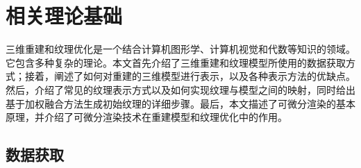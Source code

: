 \setcounter{figure}{0}
\setcounter{table}{0}
\setcounter{algocf}{0}


\chapter{相关理论基础}
三维重建和纹理优化是一个结合计算机图形学、计算机视觉和代数等知识的领域。它包含多种复杂的理论。本文首先介绍了三维重建和纹理模型所使用的数据获取方式；接着，阐述了如何对重建的三维模型进行表示，以及各种表示方法的优缺点。然后，介绍了常见的纹理表示方式以及如何实现纹理与模型之间的映射，同时给出基于加权融合方法生成初始纹理的详细步骤。最后，本文描述了可微分渲染的基本原理，并介绍了可微分渲染技术在重建模型和纹理优化中的作用。
%
%
\section{数据获取}


